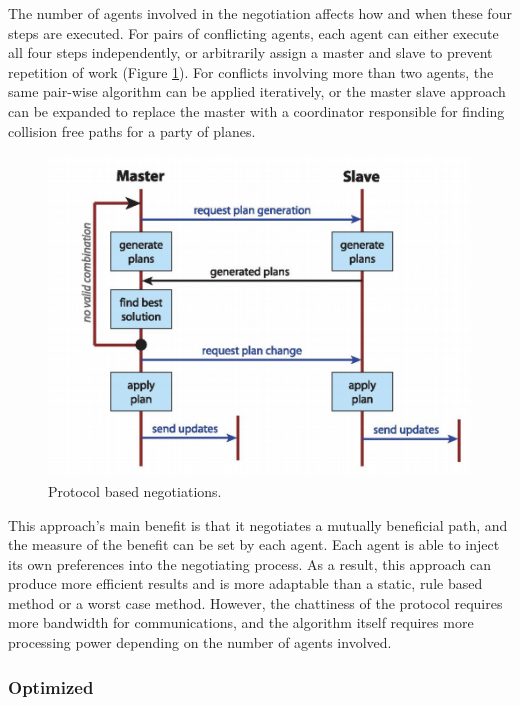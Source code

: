\documentclass[conference]{IEEEtran}
\begin{document}
The number of agents involved in the negotiation affects how and when these four steps are executed. For pairs of conflicting agents, each agent can either execute all four steps independently, or arbitrarily assign a master and slave to prevent repetition of work (Figure \ref{fig:07SislakMaster}). For conflicts involving more than two agents, the same pair-wise algorithm can be applied iteratively, or the master slave approach can be expanded to replace the master with a coordinator responsible for finding collision free paths for a party of planes.

\begin{figure}[h]
	\includegraphics [width=1\columnwidth] {07SislakMasterSlave}
	\caption{Protocol based negotiations. \cite{vsivslak2008agentfly}}
	\label{fig:07SislakMaster}
\end{figure}


This approach's main benefit is that it negotiates a mutually beneficial path, and the measure of the benefit can be set by each agent. Each agent is able to inject its own preferences into the negotiating process. As a result, this approach can produce more efficient results and is more adaptable than a static, rule based method or a worst case method. However, the chattiness of the protocol requires more bandwidth for communications, and the algorithm itself requires more processing power depending on the number of agents involved. 

\subsubsection{Optimized}
\end{document}
